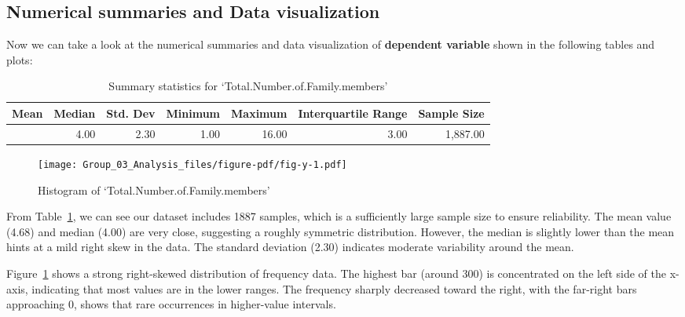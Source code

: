 \documentclass[
]{article}
\begin{document}
\hypertarget{numerical-summaries-and-data-visualization}{%
\subsection{Numerical summaries and Data
visualization}\label{numerical-summaries-and-data-visualization}}

Now we can take a look at the numerical summaries and data visualization
of \textbf{dependent variable} shown in the following tables and plots:

\hypertarget{tbl-y}{}
\begin{table}
\caption{\label{tbl-y}Summary statistics for `Total.Number.of.Family.members' }\tabularnewline

\fontsize{12.0pt}{14.4pt}\selectfont
\begin{tabular*}{\linewidth}{@{\extracolsep{\fill}}rrrrrrr}
\toprule
Mean & Median & Std. Dev & Minimum & Maximum & Interquartile Range & Sample Size \\ 
\midrule\addlinespace[2.5pt]
4.68 & 4.00 & 2.30 & 1.00 & 16.00 & 3.00 & 1,887.00 \\ 
\bottomrule
\end{tabular*}
\end{table}

\begin{figure}[H]

{\centering \texttt{[image: Group\_03\_Analysis\_files/figure-pdf/fig-y-1.pdf]}

}

\caption{\label{fig-y}Histogram of `Total.Number.of.Family.members'}

\end{figure}

From Table~\ref{tbl-y}, we can see our dataset includes 1887 samples,
which is a sufficiently large sample size to ensure reliability. The
mean value (4.68) and median (4.00) are very close, suggesting a roughly
symmetric distribution. However, the median is slightly lower than the
mean hints at a mild right skew in the data. The standard deviation
(2.30) indicates moderate variability around the mean.

Figure~\ref{fig-y} shows a strong right-skewed distribution of frequency
data. The highest bar (around 300) is concentrated on the left side of
the x-axis, indicating that most values are in the lower ranges. The
frequency sharply decreased toward the right, with the far-right bars
approaching 0, shows that rare occurrences in higher-value intervals.
\end{document}
